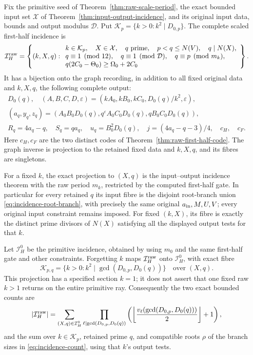 \begin{theorem}
\label{thm:raw-scale-hit-incidence}
Fix the primitive seed of Theorem~\ref{thm:raw-scale-period},
the exact bounded input set \(\mathcal X\) of
Theorem~\ref{thm:input-output-incidence}, and its original input
data, bounds and output modulus \(\mathcal D\).
Put \(\mathcal K_p=\{k>0:k^2\mid D_{0,p}\}\).
The complete scaled first-half incidence is
\[
 \mathcal I_H^{\rm raw}=
 \left\{(k,X,q):
 \begin{array}{l}
 k\in\mathcal K_p,\quad X\in\mathcal X,\quad q\text{ prime},
       \quad p<q\le N(V),\quad q\mid N(X),\\
 q\equiv1\pmod{12},\quad q\equiv1\pmod{\mathcal D},
       \quad q\equiv p\pmod{m_k},\\
 q(2C_0-\Theta_0)\ge\Omega_0+2C_0
 \end{array}\right\}.
\]
It has a bijection onto the graph recording, in addition to all
fixed original data and \(k,X,q\), the following complete output:
\[
 \begin{gathered}
 D_0(q),\quad
 (A,B,C,D,\varepsilon)
       =(kA_0,kB_0,kC_0,D_0(q)/k^2,\varepsilon),\\
 (a_q,y_q,z_q)=(A_0B_0D_0(q),
      q^\varepsilon A_0C_0D_0(q),qB_0C_0D_0(q)),\\
 R_q=4a_q-q,\quad S_q=qa_q,\quad u_q=B_0^2D_0(q),
 \quad j=(4a_q-q-3)/4,\quad c_H,\quad c_F.
 \end{gathered}
\]
Here \(c_H,c_F\) are the two distinct codes of
Theorem~\ref{thm:raw-first-half-code}.  The graph inverse is
projection to the retained fixed data and \(k,X,q\), and its
fibres are singletons.

For a fixed \(k\), the exact projection to \((X,q)\) is the
input--output incidence theorem with the raw period \(m_k\),
restricted by the computed first-half gate.  In particular for
every retained \(q\) its input fibre is the disjoint root-branch
union \eqref{eq:incidence-root-branch}, with precisely the same
original \(a_{\rm in},M,U,V\); every original input constraint
remains imposed.  For fixed \((k,X)\), its fibre is exactly the
distinct prime divisors of \(N(X)\) satisfying all the displayed
output tests for that \(k\).

Let \(\mathcal I_H^0\) be the primitive incidence, obtained by
using \(m_0\) and the same first-half gate and other constraints.
Forgetting \(k\) maps \(\mathcal I_H^{\rm raw}\) onto
\(\mathcal I_H^0\), with exact fibre
\[
 \mathcal K_{p,q}
 =\{k>0:k^2\mid\gcd(D_{0,p},D_0(q))\}
 \quad\text{over }(X,q).
\]
This projection has a specified section \(k=1\); it does not
assert that one fixed raw \(k>1\) returns on the entire primitive
ray.  Consequently the two exact bounded counts are
\[
 |\mathcal I_H^{\rm raw}|
 =\sum_{(X,q)\in\mathcal I_H^0}
   \prod_{\ell\mid\gcd(D_{0,p},D_0(q))}
       \left(\left\lfloor
          \frac{v_\ell(\gcd(D_{0,p},D_0(q)))}2
        \right\rfloor+1\right),
\]
and the sum over \(k\in\mathcal K_p\), retained prime \(q\),
and compatible roots \(\rho\) of the branch sizes in
\eqref{eq:incidence-count}, using that \(k\)'s output tests.


\end{theorem}
